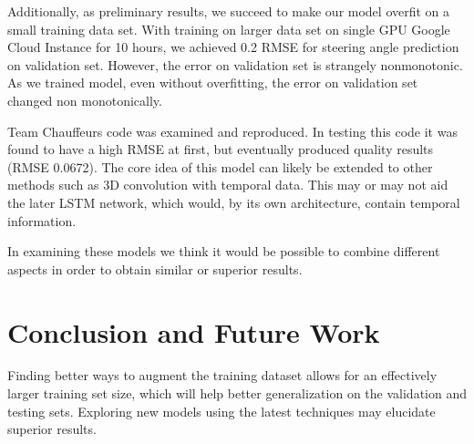 \documentclass[10pt,twocolumn,letterpaper]{article}
\begin{document}
Additionally, as preliminary results, we succeed to make our model overfit on a small training data set. With training on larger data set on single GPU Google Cloud Instance for 10 hours, we achieved 0.2 RMSE for steering angle prediction on validation set. However, the error on validation set is strangely nonmonotonic. As we trained model, even without overfitting, the error on validation set changed non monotonically.

Team Chauffeurs code was examined and reproduced. In testing this code it was found to have a high RMSE at first, but eventually produced quality results (RMSE 0.0672). The core idea of this model can likely be extended to other methods such as 3D convolution with temporal data. This may or may not aid the later LSTM network, which would, by its own architecture, contain temporal information.

In examining these models we think it would be possible to combine different aspects in order to obtain similar or superior results. 


\section{Conclusion and Future Work}
Finding better ways to augment the training dataset allows for an effectively larger training set size, which will help better generalization on the validation and testing sets. Exploring new models using the latest techniques may elucidate superior results.


{\small


}
\end{document}

